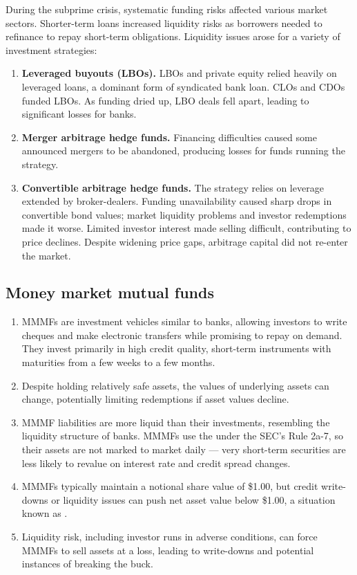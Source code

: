 During the subprime crisis, systematic funding risks affected various market sectors. Shorter-term loans increased liquidity risks as borrowers needed to refinance to repay short-term obligations. Liquidity issues arose for a variety of investment strategies:

\begin{enumerate}
\item \textbf{Leveraged buyouts (LBOs).} LBOs and private equity relied heavily on leveraged loans, a dominant form of syndicated bank loan. CLOs and CDOs funded LBOs. As funding dried up, LBO deals fell apart, leading to significant losses for banks.
\item \textbf{Merger arbitrage hedge funds.} Financing difficulties caused some announced mergers to be abandoned, producing losses for funds running the strategy.
\item \textbf{Convertible arbitrage hedge funds.} The strategy relies on leverage extended by broker-dealers. Funding unavailability caused sharp drops in convertible bond values; market liquidity problems and investor redemptions made it worse. Limited investor interest made selling difficult, contributing to price declines. Despite widening price gaps, arbitrage capital did not re-enter the market.
\end{enumerate}

\subsection{Money market mutual funds}

\begin{enumerate}[label=\alph*)]
\item MMMFs are investment vehicles similar to banks, allowing investors to write cheques and make electronic transfers while promising to repay on demand. They invest primarily in high credit quality, short-term instruments with maturities from a few weeks to a few months.
\item Despite holding relatively safe assets, the values of underlying assets can change, potentially limiting redemptions if asset values decline.
\item MMMF liabilities are more liquid than their investments, resembling the liquidity structure of banks. MMMFs use the  under the SEC's Rule 2a-7, so their assets are not marked to market daily — very short-term securities are less likely to revalue on interest rate and credit spread changes.
\item MMMFs typically maintain a notional share value of \$1.00, but credit write-downs or liquidity issues can push net asset value below \$1.00, a situation known as .
\item Liquidity risk, including investor runs in adverse conditions, can force MMMFs to sell assets at a loss, leading to write-downs and potential instances of breaking the buck.
\end{enumerate}

